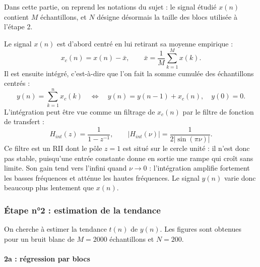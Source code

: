 \documentclass[11pt,a4paper]{article}
\begin{document}
Dans cette partie, on reprend les notations du sujet : le signal étudié $x(n)$ contient
$M$ échantillons, et $N$ désigne désormais la taille des blocs utilisée à l'étape 2.

Le signal $x(n)$ est d'abord centré en lui retirant sa moyenne empirique :
\begin{equation}
  x_c(n) = x(n) - \bar{x}, \qquad \bar{x} = \frac{1}{M}\sum_{k=1}^{M} x(k).
  \label{eq:centrage}
\end{equation}
Il est ensuite intégré, c'est-à-dire que l'on fait la somme cumulée des échantillons centrés :
\begin{equation}
  y(n) = \sum_{k=1}^{n} x_c(k)
  \quad \iff \quad
  y(n) = y(n-1) + x_c(n), \quad y(0) = 0.
  \label{eq:integration}
\end{equation}
L'intégration peut être vue comme un filtrage de $x_c(n)$ par le filtre de fonction de transfert :
\begin{equation}
  H_{int}(z) = \frac{1}{1 - z^{-1}},
  \qquad
  \left|H_{int}(\nu)\right| = \frac{1}{2\left|\sin(\pi\nu)\right|}.
  \label{eq:Hint}
\end{equation}
Ce filtre est un RII dont le pôle $z = 1$ est situé sur le cercle unité : il n'est donc pas
stable, puisqu'une entrée constante donne en sortie une rampe qui croît sans limite. Son gain tend vers l'infini quand $\nu \to 0$ : l'intégration amplifie
fortement les basses fréquences et atténue les hautes fréquences. Le signal $y(n)$ varie donc
beaucoup plus lentement que $x(n)$.

\subsubsection{Étape n°2 : estimation de la tendance}

On cherche à estimer la tendance $t(n)$ de $y(n)$. Les
figures sont obtenues pour un bruit blanc de $M = 2000$ échantillons et $N = 200$.

\paragraph{2a : régression par blocs}
\end{document}
